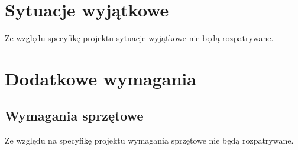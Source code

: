 \documentclass[a4paper,10pt]{article}
\begin{document}



\section{Sytuacje wyjątkowe}


Ze względu specyfikę projektu sytuacje wyjątkowe nie będą rozpatrywane.





\section{Dodatkowe wymagania}


\subsection{Wymagania sprzętowe}


Ze względu na specyfikę projektu wymagania sprzętowe nie będą rozpatrywane.

\end{document}
